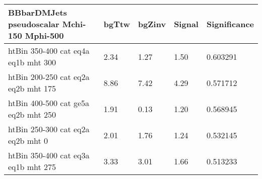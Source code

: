  \begin{tabular}{|l|l|l|l|l|}
\small
   \label{mostSensitiveBins_BBbarDMJets_pseudoscalar_Mchi-150_Mphi-500_25ns}
	\textbf{BBbarDMJets pseudoscalar Mchi-150 Mphi-500}	 & 	bgTtw	 & 	bgZinv	 & 	Signal &	 Significance \\ 
	\hline
	htBin 350-400 cat eq4a eq1b mht 300 & 	2.34	 & 	1.27	 & 	1.50 	&0.603291 \\ 
	htBin 200-250 cat eq2a eq2b mht 175 & 	8.86	 & 	7.42	 & 	4.29 	&0.571712 \\ 
	htBin 400-500 cat ge5a eq2b mht 250 & 	1.91	 & 	0.13	 & 	1.20 	&0.568945 \\ 
	htBin 250-300 cat eq2a eq2b mht 0 & 	2.01	 & 	1.76	 & 	1.24 	&0.532145 \\ 
	htBin 350-400 cat eq3a eq1b mht 275 & 	3.33	 & 	3.01	 & 	1.66 	&0.513233 \\ 
\end{tabular}

